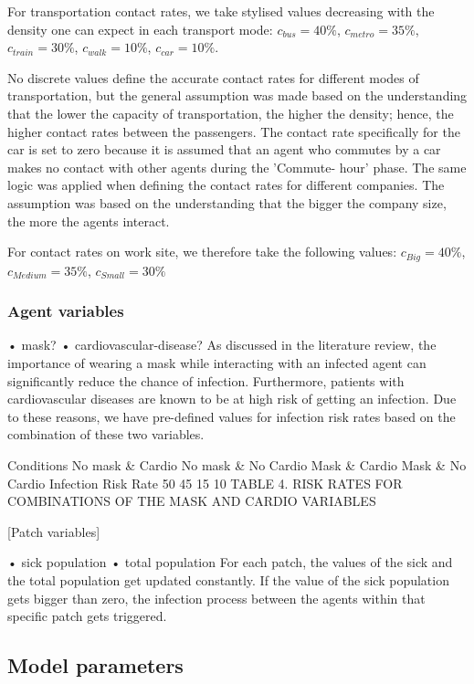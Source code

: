 \documentclass[smallextended]{svjour3}       %
\begin{document}
For transportation contact rates, we take stylised values decreasing with the density one can expect in each transport mode: $c_{bus} = 40\%$, $c_{metro} = 35\%$, $c_{train} = 30\%$, $c_{walk} = 10\%$, $c_{car} = 10\%$.

No discrete values define the accurate contact rates for different modes of transportation, but the general assumption was made based on the understanding that the lower the capacity of transportation, the higher the density; hence, the higher contact rates between the passengers. The contact rate specifically for the car is set to zero because it is assumed that an agent who commutes by a car makes no contact with other agents during the 'Commute- hour' phase. The same logic was applied when defining the contact rates for different companies. The assumption was based on the understanding that the bigger the company size, the more the agents interact.

For contact rates on work site, we therefore take the following values: $c_{Big} = 40\%$, $c_{Medium} = 35\%$, $c_{Small} = 30\%$


\subsubsection{Agent variables}


• mask?
• cardiovascular-disease?
As discussed in the literature review, the importance of wearing a mask while interacting with an infected agent can significantly reduce the chance of infection. Furthermore, patients with cardiovascular diseases are known to be at high risk of getting an infection. Due to these reasons, we have pre-defined values for infection risk rates based on the combination of these two variables.

Conditions
No mask \& Cardio
No mask \& No Cardio
Mask \& Cardio
Mask \& No Cardio
Infection Risk Rate
50 %
45 %
15 %
10 %
TABLE 4. RISK RATES FOR COMBINATIONS OF THE MASK AND CARDIO VARIABLES



[Patch variables]

• sick population
• total population
For each patch, the values of the sick and the total population get updated constantly. If the value of the sick population gets bigger than zero, the infection process between the agents within that specific patch gets triggered.


\subsection{Model parameters}
\end{document}
